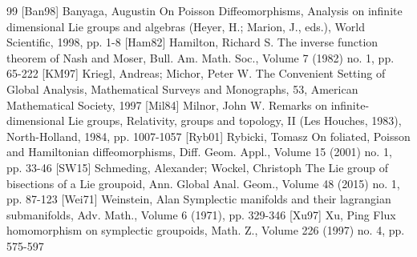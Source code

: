 \documentclass[10pt]{amsart}
\theoremstyle{definition}
\begin{document}
\begin{thebibliography}{99}
 [Ban98] Banyaga, Augustin On Poisson Diffeomorphisms, Analysis on infinite dimensional Lie groups and algebras (Heyer, H.; Marion, J., eds.), World Scientific, 1998, pp. 1-8
 [Ham82] Hamilton, Richard S. The inverse function theorem of Nash and Moser, Bull. Am. Math. Soc., Volume 7 (1982) no. 1, pp. 65-222
 [KM97] Kriegl, Andreas; Michor, Peter W. The Convenient Setting of Global Analysis, Mathematical Surveys and Monographs, 53, American Mathematical Society, 1997
 [Mil84] Milnor, John W. Remarks on infinite-dimensional Lie groups, Relativity, groups and topology, II (Les Houches, 1983), North-Holland, 1984, pp. 1007-1057
 [Ryb01] Rybicki, Tomasz On foliated, Poisson and Hamiltonian diffeomorphisms, Diff. Geom. Appl., Volume 15 (2001) no. 1, pp. 33-46
 [SW15] Schmeding, Alexander; Wockel, Christoph The Lie group of bisections of a Lie groupoid, Ann. Global Anal. Geom., Volume 48 (2015) no. 1, pp. 87-123
 [Wei71] Weinstein, Alan Symplectic manifolds and their lagrangian submanifolds, Adv. Math., Volume 6 (1971), pp. 329-346
 [Xu97] Xu, Ping Flux homomorphism on symplectic groupoids, Math. Z., Volume 226 (1997) no. 4, pp. 575-597
\end{thebibliography}
\end{document}
